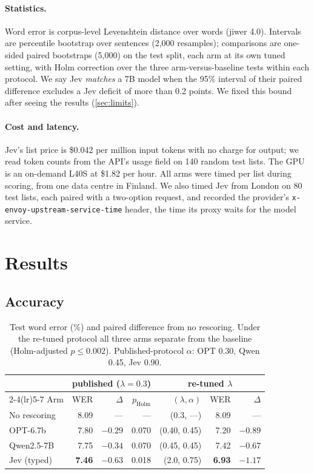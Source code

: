 \documentclass[11pt]{article}
\begin{document}
\paragraph{Statistics.} Word error is corpus-level Levenshtein distance over words
(jiwer 4.0). Intervals are percentile bootstrap over sentences (2,000 resamples);
comparisons are one-sided paired bootstraps (5,000) on the test split, each arm at its own
tuned setting, with Holm correction over the three arm-versus-baseline tests within each
protocol. We say Jev \emph{matches} a 7B model when the 95\% interval of their paired
difference excludes a Jev deficit of more than 0.2 points. We fixed this bound after
seeing the results (\cref{sec:limits}).

\paragraph{Cost and latency.} Jev's list price is \$0.042 per million input tokens with
no charge for output; we read token counts from the API's usage field on 140 random test
lists. The GPU is an on-demand L40S at \$1.82 per hour. All arms were timed per list
during scoring, from one data centre in Finland. We also timed Jev from London on 80 test
lists, each paired with a two-option request, and recorded the provider's
\texttt{x-envoy-upstream-service-time} header, the time its proxy waits for the model
service.

\section{Results}
\label{sec:results}


\subsection{Accuracy}
\label{sec:acc}

\begin{table}[t]
\centering\small
\begin{tabular}{lrrrrrr}
\toprule
& \multicolumn{3}{c}{published ($\lambda = 0.3$)} & \multicolumn{3}{c}{re-tuned $\lambda$} \\
\cmidrule(lr){2-4}\cmidrule(lr){5-7}
Arm & WER & $\Delta$ & $p_{\text{Holm}}$ & $(\lambda, \alpha)$ & WER & $\Delta$ \\
\midrule
No rescoring & 8.09 & --- & --- & (0.3, ---) & 8.09 & --- \\
OPT-6.7b & 7.80 & $-0.29$ & 0.070 & (0.40, 0.45) & 7.20 & $-0.89$ \\
Qwen2.5-7B & 7.75 & $-0.34$ & 0.070 & (0.45, 0.45) & 7.42 & $-0.67$ \\
Jev (typed) & \textbf{7.46} & $-0.63$ & 0.018 & (2.0, 0.75) & \textbf{6.93} & $-1.17$ \\
\bottomrule
\end{tabular}
\caption{Test word error (\%) and paired difference from no rescoring. Under the
re-tuned protocol all three arms separate from the baseline (Holm-adjusted $p \le 0.002$).
Published-protocol $\alpha$: OPT 0.30, Qwen 0.45, Jev 0.90.}
\label{tab:acc}
\end{table}
\end{document}
